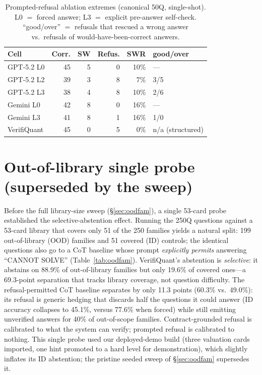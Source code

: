 \begin{table}[t]
\caption{Prompted-refusal ablation extremes (canonical 50Q, single-shot). L0 $=$ forced answer; L3 $=$ explicit pre-answer self-check. ``good/over'' $=$ refusals that rescued a wrong answer vs.\ refusals of would-have-been-correct answers.}
\label{tab:refusal}
\small
\begin{tabular}{@{}lrrrrl@{}}
\toprule
Cell & Corr. & SW & Refus. & SWR & good/over \\
\midrule
GPT-5.2 L0 & 45 & 5 & 0 & 10\% & --- \\
GPT-5.2 L2 & 39 & 3 & 8 & 7\% & 3/5 \\
GPT-5.2 L3 & 38 & 4 & 8 & 10\% & 2/6 \\
Gemini L0 & 42 & 8 & 0 & 16\% & --- \\
Gemini L3 & 41 & 8 & 1 & 16\% & 1/0 \\
\midrule
VerifiQuant & 45 & 0 & 5 & 0\% & n/a (structured) \\
\bottomrule
\end{tabular}
\end{table}

\section{Out-of-library single probe (superseded by the sweep)}\label{app:oodprobe}
Before the full library-size sweep (\S\ref{sec:oodfam}), a single 53-card probe established the selective-abstention effect.
Running the 250Q questions against a 53-card library that covers only 51 of the 250 families yields a natural split: 199 out-of-library (OOD) families and 51 covered (ID) controls; the identical questions also go to a CoT baseline whose prompt \emph{explicitly permits} answering ``CANNOT SOLVE'' (Table~\ref{tab:oodfam}).
VerifiQuant's abstention is \emph{selective}: it abstains on 88.9\% of out-of-library families but only 19.6\% of covered ones---a 69.3-point separation that tracks library coverage, not question difficulty.
The refusal-permitted CoT baseline separates by only 11.3 points (60.3\% vs.\ 49.0\%): its refusal is generic hedging that discards half the questions it could answer (ID accuracy collapses to 45.1\%, versus 77.6\% when forced) while still emitting unverified answers for 40\% of out-of-scope families.
Contract-grounded refusal is calibrated to what the system can verify; prompted refusal is calibrated to nothing.
This single probe used our deployed-demo build (three valuation cards imported, one hint promoted to a hard level for demonstration), which slightly inflates its ID abstention; the pristine seeded sweep of \S\ref{sec:oodfam} supersedes it.


